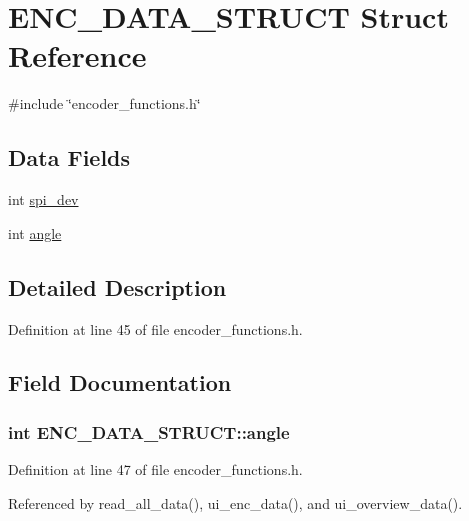 \hypertarget{structENC__DATA__STRUCT}{\section{E\-N\-C\-\_\-\-D\-A\-T\-A\-\_\-\-S\-T\-R\-U\-C\-T Struct Reference}
\label{structENC__DATA__STRUCT}
}


{\ttfamily \#include \char`\"{}encoder\-\_\-functions.\-h\char`\"{}}

\subsection*{Data Fields}
\begin{DoxyCompactItemize}
\item 
int \hyperlink{structENC__DATA__STRUCT_a93b8e925392a12a8874bf59f2a1cd76a}{spi\-\_\-dev}
\item 
int \hyperlink{structENC__DATA__STRUCT_ad25beb30fd5b975292f87db02ec9930a}{angle}
\end{DoxyCompactItemize}


\subsection{Detailed Description}


Definition at line 45 of file encoder\-\_\-functions.\-h.



\subsection{Field Documentation}
\hypertarget{structENC__DATA__STRUCT_ad25beb30fd5b975292f87db02ec9930a}{
\subsubsection[{angle}]{\setlength{\rightskip}{0pt plus 5cm}int E\-N\-C\-\_\-\-D\-A\-T\-A\-\_\-\-S\-T\-R\-U\-C\-T\-::angle}}\label{structENC__DATA__STRUCT_ad25beb30fd5b975292f87db02ec9930a}


Definition at line 47 of file encoder\-\_\-functions.\-h.



Referenced by read\-\_\-all\-\_\-data(), ui\-\_\-enc\-\_\-data(), and ui\-\_\-overview\-\_\-data().

